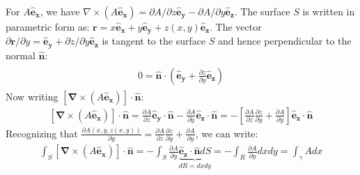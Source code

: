 \documentclass[letterpaper,10pt,english]{jupyterBook}
\begin{document}
\sphinxAtStartPar
For \(A\mathbf{\hat{e}_x}\), we have \({\nabla} \times (A \mathbf{\hat{e}_x}) =
{\partial A}/{\partial z} \mathbf{\hat{e}_y} - {\partial A}/{\partial y} \mathbf{\hat{e}_z}\).
The surface \(S\) is written in parametric form as: \(\mathbf{r} = x\mathbf{\hat{e}_x} +
y\mathbf{\hat{e}_y} + z(x,y)\mathbf{\hat{e}_z}\). The vector \({\partial \mathbf{r}}/{\partial y} = \mathbf{\hat{e}_y} +
{\partial z}/{\partial y} \mathbf{\hat{e}_z} \) is tangent to the surface \(S\) and hence perpendicular to the normal \(\mathbf{\hat{n}}\):
\begin{equation*}
\begin{split}
\begin{aligned}
0 = \mathbf{\hat{n}} \cdot \left(\mathbf{\hat{e}_y} +
\frac{\partial z}{\partial y} \mathbf{\hat{e}_z} \right)
\end{aligned}
\end{split}
\end{equation*}
\sphinxAtStartPar
Now writing \([\mathbf{\nabla} \times (A \mathbf{\hat{e}_x})] \cdot \mathbf{\hat{n}}\):
\begin{equation*}
\begin{split}
 [\mathbf{\nabla} \times (A \mathbf{\hat{e}_x})] \cdot \mathbf{\hat{n}} =
  \frac{\partial A}{\partial z} \mathbf{\hat{e}_y} \cdot \mathbf{\hat{n}}
   - \frac{\partial A}{\partial y} \mathbf{\hat{e}_z}\cdot \mathbf{\hat{n}} =
  - \left[ \frac{\partial A}{\partial z} \frac{\partial z}{\partial y} +
  \frac{\partial A}{\partial y}  \right] \mathbf{\hat{e}_z}\cdot \mathbf{\hat{n}}
\end{split}
\end{equation*}
\sphinxAtStartPar
Recognizing that \(\frac{\partial A(x,y,z(x,y))}{\partial y} = \frac{\partial A}{\partial z} \frac{\partial z}{\partial y} +
  \frac{\partial A}{\partial y}\), we can write:
\begin{equation*}
\begin{split}
 \int_S [\mathbf{\nabla} \times (A \mathbf{\hat{e}_x})] \cdot \mathbf{\hat{n}} =
 - \int_S \frac{\partial A}{\partial y} \underbrace{\mathbf{\hat{e}_z}\cdot \mathbf{\hat{n}} dS}_{dR = dx dy} =
 - \int_R \frac{\partial A}{\partial y} dx dy = \int_\gamma A dx
\end{split}
\end{equation*}
\end{document}
